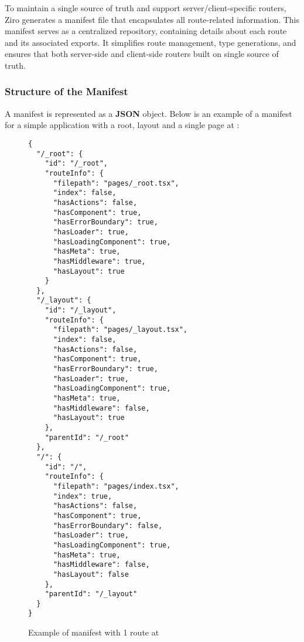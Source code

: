To maintain a single source of truth and support server/client-specific routers, Ziro generates a manifest file that encapsulates all route-related information. This manifest serves as a centralized repository, containing details about each route and its associated exports. It simplifies route management, type generations, and ensures that both server-side and client-side routers built on single source of truth.

\subsubsection{Structure of the Manifest}
A manifest is represented as a \textbf{JSON} object. Below is an example of a manifest for a simple application with a root, layout and a single page at \cc{/}:

\pagebreak
\begin{figure}[H]
\begin{verbatim}
{
  "/_root": {
    "id": "/_root",
    "routeInfo": {
      "filepath": "pages/_root.tsx",
      "index": false,
      "hasActions": false,
      "hasComponent": true,
      "hasErrorBoundary": true,
      "hasLoader": true,
      "hasLoadingComponent": true,
      "hasMeta": true,
      "hasMiddleware": true,
      "hasLayout": true
    }
  },
  "/_layout": {
    "id": "/_layout",
    "routeInfo": {
      "filepath": "pages/_layout.tsx",
      "index": false,
      "hasActions": false,
      "hasComponent": true,
      "hasErrorBoundary": true,
      "hasLoader": true,
      "hasLoadingComponent": true,
      "hasMeta": true,
      "hasMiddleware": false,
      "hasLayout": true
    },
    "parentId": "/_root"
  },
  "/": {
    "id": "/",
    "routeInfo": {
      "filepath": "pages/index.tsx",
      "index": true,
      "hasActions": false,
      "hasComponent": true,
      "hasErrorBoundary": false,
      "hasLoader": true,
      "hasLoadingComponent": true,
      "hasMeta": true,
      "hasMiddleware": false,
      "hasLayout": false
    },
    "parentId": "/_layout"
  }
}
\end{verbatim}
\caption{Example of manifest with 1 route at \cc{/}}
\end{figure}

\pagebreak

